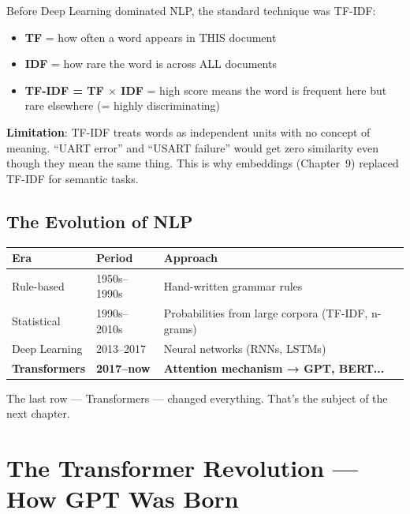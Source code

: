 \documentclass[11pt,a4paper]{report}
\begin{document}
Before Deep Learning dominated NLP, the standard technique was TF-IDF:

\begin{itemize}
    \item \textbf{TF} = how often a word appears in THIS document
    \item \textbf{IDF} = how rare the word is across ALL documents
    \item \textbf{TF-IDF = TF $\times$ IDF} = high score means the word is frequent here but rare elsewhere (= highly discriminating)
\end{itemize}

\textbf{Limitation}: TF-IDF treats words as independent units with no concept of meaning. ``UART error'' and ``USART failure'' would get zero similarity even though they mean the same thing. This is why embeddings (Chapter~9) replaced TF-IDF for semantic tasks.

\section{The Evolution of NLP}

\begin{table}[h]
\centering
\begin{tabularx}{\textwidth}{l l X}
\toprule
\textbf{Era} & \textbf{Period} & \textbf{Approach} \\
\midrule
Rule-based & 1950s--1990s & Hand-written grammar rules \\
Statistical & 1990s--2010s & Probabilities from large corpora (TF-IDF, n-grams) \\
Deep Learning & 2013--2017 & Neural networks (RNNs, LSTMs) \\
\textbf{Transformers} & \textbf{2017--now} & \textbf{Attention mechanism → GPT, BERT...} \\
\bottomrule
\end{tabularx}
\end{table}

The last row --- Transformers --- changed everything. That's the subject of the next chapter.

\chapter{The Transformer Revolution --- How GPT Was Born}
\end{document}
